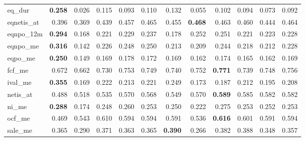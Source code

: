 \begin{landscape}
\begin{longtable}{>{\raggedright\arraybackslash}p{2.6cm}rrrrrrrrrrr}
eq\_dur & \textbf{0.258} & 0.026 & 0.115 & 0.093 & 0.110 & 0.132 & 0.055 & 0.102 & 0.094 & 0.073 & 0.092 \\
eqnetis\_at & 0.396 & 0.369 & \cellcolor{blue!10}0.439 & \cellcolor{blue!10}0.457 & \cellcolor{blue!10}0.465 & \cellcolor{blue!10}0.455 & \textbf{\cellcolor{blue!10}0.468} & \cellcolor{blue!10}0.463 & \cellcolor{blue!10}0.460 & \cellcolor{blue!10}0.444 & \cellcolor{blue!10}0.464 \\
eqnpo\_12m & \textbf{0.294} & 0.168 & 0.221 & 0.229 & 0.237 & 0.178 & 0.252 & 0.251 & 0.221 & 0.223 & 0.228 \\
eqnpo\_me & \textbf{0.316} & 0.142 & 0.226 & 0.248 & 0.250 & 0.213 & 0.209 & 0.244 & 0.218 & 0.212 & 0.228 \\
eqpo\_me & \textbf{0.250} & 0.149 & 0.169 & 0.178 & 0.172 & 0.169 & 0.162 & 0.174 & 0.165 & 0.162 & 0.169 \\
fcf\_me & 0.672 & 0.662 & \cellcolor{blue!10}0.730 & \cellcolor{blue!10}0.753 & \cellcolor{blue!10}0.749 & \cellcolor{blue!10}0.740 & \cellcolor{blue!10}0.752 & \textbf{\cellcolor{blue!10}0.771} & \cellcolor{blue!10}0.739 & \cellcolor{blue!10}0.748 & \cellcolor{blue!10}0.756 \\
ival\_me & \textbf{0.355} & 0.169 & 0.222 & 0.213 & 0.221 & 0.249 & 0.173 & 0.187 & 0.212 & 0.195 & 0.208 \\
netis\_at & 0.488 & 0.518 & \cellcolor{blue!10}0.535 & \cellcolor{blue!10}0.570 & \cellcolor{blue!10}0.568 & \cellcolor{blue!10}0.549 & \cellcolor{blue!10}0.570 & \textbf{\cellcolor{blue!10}0.589} & \cellcolor{blue!10}0.585 & \cellcolor{blue!10}0.582 & \cellcolor{blue!10}0.582 \\
ni\_me & \textbf{0.288} & 0.174 & 0.248 & 0.260 & 0.253 & 0.250 & 0.222 & 0.275 & 0.253 & 0.252 & 0.253 \\
ocf\_me & 0.469 & 0.543 & \cellcolor{blue!10}0.610 & \cellcolor{blue!10}0.594 & \cellcolor{blue!10}0.594 & \cellcolor{blue!10}0.591 & 0.536 & \textbf{\cellcolor{blue!10}0.616} & \cellcolor{blue!10}0.601 & \cellcolor{blue!10}0.591 & \cellcolor{blue!10}0.594 \\
sale\_me & 0.365 & 0.290 & \cellcolor{blue!10}0.371 & 0.363 & \cellcolor{blue!10}0.365 & \textbf{\cellcolor{blue!10}0.390} & 0.266 & \cellcolor{blue!10}0.382 & \cellcolor{blue!10}0.388 & 0.348 & 0.357 \\
\hline
\end{longtable}
\endgroup
\end{landscape}
